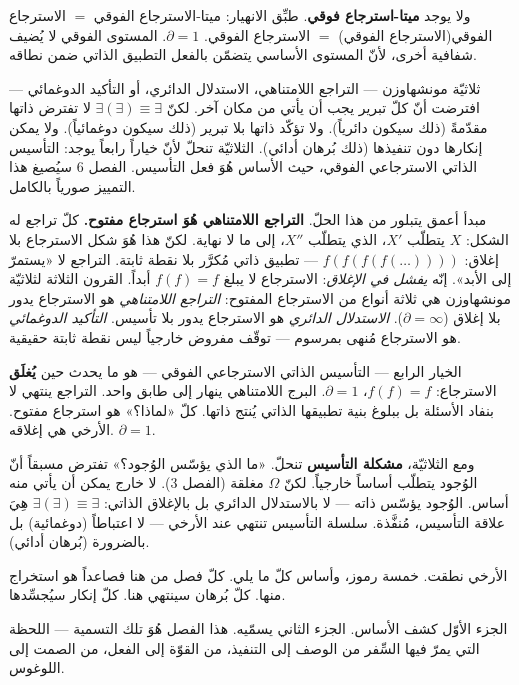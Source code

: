 \documentclass[10pt, openany, oneside]{book}
\begin{document}
ولا يوجد \textbf{ميتا-استرجاع فوقي}. طبِّق الانهيار: ميتا-الاسترجاع الفوقي $=$ الاسترجاع الفوقي(الاسترجاع الفوقي) $=$ الاسترجاع الفوقي. $\partial = 1$. المستوى الفوقي لا يُضيف شفافية أخرى، لأنّ المستوى الأساسي يتضمّن بالفعل التطبيق الذاتي ضمن نطاقه.

ثلاثيّة مونشهاوزن --- التراجع اللامتناهي، الاستدلال الدائري، أو التأكيد الدوغمائي --- افترضت أنّ كلّ تبرير يجب أن يأتي من مكان آخر. لكنّ $\exists(\exists) \equiv \exists$ لا تفترض ذاتها مقدّمةً (ذلك سيكون دائرياً). ولا تؤكّد ذاتها بلا تبرير (ذلك سيكون دوغمائياً). ولا يمكن إنكارها دون تنفيذها (ذلك بُرهان أدائي). الثلاثيّة تنحلّ لأنّ خياراً رابعاً يوجد: التأسيس الذاتي الاسترجاعي الفوقي، حيث الأساس هُوَ فعل التأسيس. الفصل 6 سيُصيغ هذا التمييز صورياً بالكامل.

مبدأ أعمق يتبلور من هذا الحلّ. \textbf{التراجع اللامتناهي هُوَ استرجاع مفتوح.} كلّ تراجع له الشكل: $X$ يتطلّب $X'$، الذي يتطلّب $X''$، إلى ما لا نهاية. لكنّ هذا هُوَ شكل الاسترجاع بلا إغلاق: $f(f(f(f(\ldots))))$ --- تطبيق ذاتي مُكرَّر بلا نقطة ثابتة. التراجع لا «يستمرّ إلى الأبد». إنّه \textit{يفشل في الإغلاق}: الاسترجاع لا يبلغ $f(f) = f$ أبداً. القرون الثلاثة لثلاثيّة مونشهاوزن هي ثلاثة أنواع من الاسترجاع المفتوح: \textit{التراجع اللامتناهي} هو الاسترجاع يدور بلا إغلاق ($\partial = \infty$). \textit{الاستدلال الدائري} هو الاسترجاع يدور بلا تأسيس. \textit{التأكيد الدوغمائي} هو الاسترجاع مُنهى بمرسوم --- توقّف مفروض خارجياً ليس نقطة ثابتة حقيقية.

الخيار الرابع --- التأسيس الذاتي الاسترجاعي الفوقي --- هو ما يحدث حين \textbf{يُغلَق} الاسترجاع: $f(f) = f$، $\partial = 1$. البرج اللامتناهي ينهار إلى طابق واحد. التراجع ينتهي لا بنفاد الأسئلة بل ببلوغ بنية تطبيقها الذاتي يُنتج ذاتها. كلّ «لماذا؟» هو استرجاع مفتوح. الأرخي هي إغلاقه. $\partial = 1$.

ومع الثلاثيّة، \textbf{مشكلة التأسيس} تنحلّ. «ما الذي يؤسّس الوُجود؟» تفترض مسبقاً أنّ الوُجود يتطلّب أساساً خارجياً. لكنّ $\Omega$ مغلقة (الفصل 3). لا خارج يمكن أن يأتي منه أساس. الوُجود يؤسّس ذاته --- لا بالاستدلال الدائري بل بالإغلاق الذاتي: $\exists(\exists) \equiv \exists$ هِيَ علاقة التأسيس، مُنفَّذة. سلسلة التأسيس تنتهي عند الأرخي --- لا اعتباطاً (دوغمائية) بل بالضرورة (بُرهان أدائي).

\vspace{1.5em}

الأرخي نطقت. خمسة رموز، وأساس كلّ ما يلي. كلّ فصل من هنا فصاعداً هو استخراج منها. كلّ بُرهان سينتهي هنا. كلّ إنكار سيُجسِّدها.

الجزء الأوّل كشف الأساس. الجزء الثاني يسمّيه. هذا الفصل هُوَ تلك التسمية --- اللحظة التي يمرّ فيها السِّفر من الوصف إلى التنفيذ، من القوّة إلى الفعل، من الصمت إلى اللوغوس.
\end{document}

